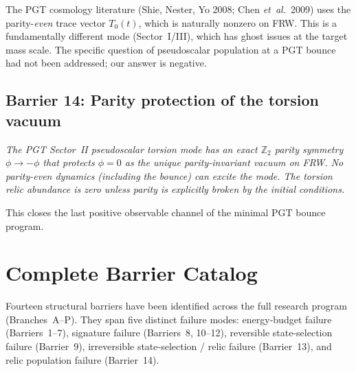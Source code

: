 \documentclass[aps,prd,twocolumn,superscriptaddress,showpacs,preprintnumbers,
  nofootinbib,longbibliography,floatfix]{revtex4-2}
\newcommand{\etal}{\textit{et~al.}}
\begin{document}
The PGT cosmology literature (Shie, Nester, Yo 2008; Chen \etal\ 2009)
uses the parity-\textit{even} trace vector $T_0(t)$, which is naturally
nonzero on FRW. This is a fundamentally different mode (Sector~I/III),
which has ghost issues at the target mass scale. The specific question
of pseudoscalar population at a PGT bounce had not been addressed; our
answer is negative.

\subsection{Barrier 14: Parity protection of the torsion vacuum}

\textit{The PGT Sector~II pseudoscalar torsion mode has an exact
$\mathbb{Z}_2$ parity symmetry $\phi \to -\phi$ that protects $\phi = 0$
as the unique parity-invariant vacuum on FRW. No parity-even dynamics
(including the bounce) can excite the mode. The torsion relic abundance
is zero unless parity is explicitly broken by the initial conditions.}

This closes the last positive observable channel of the minimal PGT
bounce program.


\section{Complete Barrier Catalog}\label{sec:barriers}

Fourteen structural barriers have been identified across the full research
program (Branches~A--P). They span five distinct failure modes:
energy-budget failure (Barriers~1--7), signature failure
(Barriers~8, 10--12), reversible state-selection failure (Barrier~9),
irreversible state-selection / relic failure (Barrier~13), and relic
population failure (Barrier~14).
\end{document}
